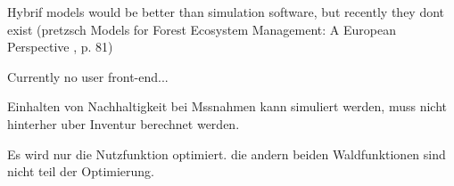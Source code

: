 Hybrif models would be better than simulation software, but recently they dont exist (pretzsch Models for Forest Ecosystem Management: A European Perspective
, p. 81)

Currently no user front-end...

Einhalten von Nachhaltigkeit bei Mssnahmen kann simuliert werden, muss nicht hinterher uber Inventur berechnet werden.

Es wird nur die Nutzfunktion optimiert. die andern beiden Waldfunktionen sind nicht teil der Optimierung.
